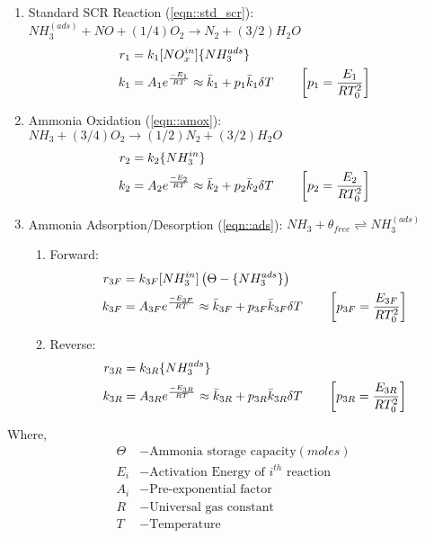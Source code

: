 \begin{enumerate}
\item Standard SCR Reaction (\ref{eqn::std_scr}):
$ NH_3 ^{(ads)} +  NO + (1/4) O_2 \longrightarrow  N_2 + (3/2) H_2O$
\begin{align}
    r_1 &= k_1 [NO_x^{in}] \{NH_3^{ads}\}\\
    k_1 &= A_1 e^{\frac{-E_1}{RT}} \approx \bar k_1 + p_1 \bar k_1 \delta T \qquad \left[ p_1 = \frac{E_1}{R T_0^2} \right]
\end{align}

\item Ammonia Oxidation (\ref{eqn::amox}):
    $ NH_3 + (3/4) O_2 \longrightarrow (1/2) N_2 + (3/2) H_2O$
\begin{align}
    r_2 &= k_2 \{NH_3^{in}\}\\
    k_2 &= A_2 e^{\frac{-E_2}{RT}} \approx \bar k_2 + p_2 \bar k_2 \delta T \qquad \left[ p_2 = \frac{E_2}{R T_0^2} \right]
\end{align}

\item Ammonia Adsorption/Desorption (\ref{eqn::ads}):
$NH_3 + \theta_{free} \rightleftharpoons  NH_3^{(ads)}$
\begin{enumerate}
\item Forward:
\begin{align}
    r_{3F} &= k_{3F} [NH_3^{in}] \left( \Theta - \{NH_3^{ads}\} \right)\\
    k_{3F} &= A_{3F} e^{\frac{-E_{3F}}{RT}} \approx \bar k_{3F} + p_{3F} \bar k_{3F} \delta T \qquad \left[ p_{3F} = \frac{E_{3F}}{R T_0^2} \right]
\end{align}

\item Reverse:
\begin{align}
    r_{3R} &= k_{3R} \{NH_3^{ads}\}\\
    k_{3R} &= A_{3R} e^{\frac{-E_{3R}}{RT}} \approx \bar k_{3R} + p_{3R} \bar k_{3R} \delta T \qquad \left[ p_{3R} = \frac{E_{3R}}{R T_0^2} \right]
\end{align}
\end{enumerate}
\end{enumerate}

Where,
\begin{align*}
    \Theta &- \text{Ammonia storage capacity} (moles)\\
    E_i &- \text{Activation Energy of $i^{th}$ reaction}\\
    A_i &- \text{Pre-exponential factor}\\
    R &- \text{Universal gas constant}\\
    T &- \text{Temperature}\\
\end{align*}
